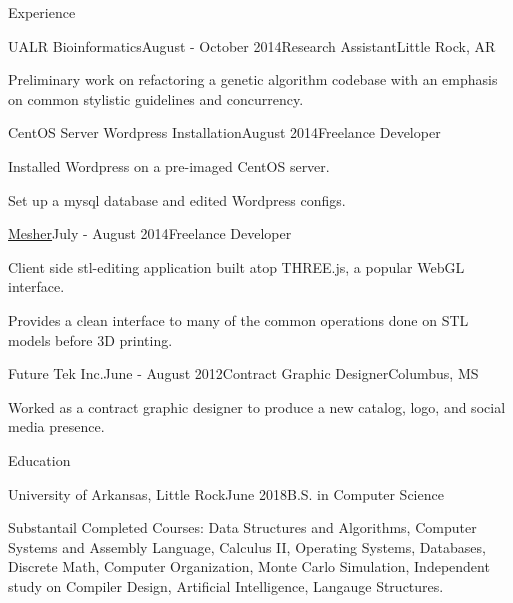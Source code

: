 \documentclass{resume} %
\begin{document}
\begin{rSection}{Experience}
\begin{rSubsection}{UALR Bioinformatics}{August - October 2014}{Research Assistant}{Little Rock, AR}

	\item Preliminary work on refactoring a genetic algorithm codebase with an emphasis on common stylistic guidelines and concurrency.
\end{rSubsection}

\begin{rSubsection}{CentOS Server Wordpress Installation}{August 2014}{Freelance Developer}{}

	\item Installed Wordpress on a pre-imaged CentOS server.
	\item Set up a mysql database and edited Wordpress configs.
\end{rSubsection}

\begin{rSubsection}{\href{http://github.com/cptaffe/Mesher}{Mesher}}{July - August 2014}{Freelance Developer}{}

	\item Client side stl-editing application built atop THREE.js, a popular WebGL interface.
	\item Provides a clean interface to many of the common operations done on STL models before 3D printing.
\end{rSubsection}

\begin{rSubsection}{Future Tek Inc.}{June - August 2012}{Contract Graphic Designer}{Columbus, MS}

	\item Worked as a contract graphic designer to produce a new catalog, logo, and social media presence.
\end{rSubsection}

\end{rSection}


\begin{rSection}{Education}

\begin{rSubsection}{University of Arkansas, Little Rock}{June 2018}{B.S. in Computer Science}

	\item Substantail Completed Courses: Data Structures and Algorithms, Computer Systems and Assembly Language, Calculus II, Operating Systems, Databases, Discrete Math, Computer Organization, Monte Carlo Simulation, Independent study on Compiler Design, Artificial Intelligence, Langauge Structures.
\end{rSubsection}

\end{rSection}
\end{document}

